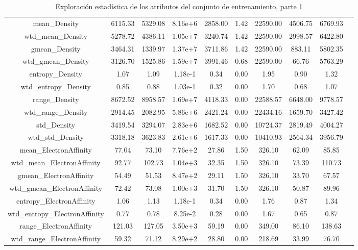 \documentclass[11pt]{article}
\begin{document}
\begin{table}[H]
{\begin{tabular}{|c|c|c|c|c|c|c|c|c|c|}
mean\_Density                     &  6115.33&  5329.08&  8.16e+6&  2858.00&    1.42&  22590.00&  4506.75&  6769.93 \\
wtd\_mean\_Density                 &  5278.72&  4386.11&  1.05e+7&  3240.74&    1.42&  22590.00&  2998.57&  6422.80 \\
gmean\_Density                    &  3464.31&  1339.97&  1.37e+7&  3711.86&    1.42&  22590.00&   883.11&  5802.35 \\
wtd\_gmean\_Density                &  3126.70&  1525.86&  1.59e+7&  3991.46&    0.68&  22590.00&    66.76&  5763.29 \\
entropy\_Density                  &     1.07&     1.09&  1.18e-1&     0.34&    0.00&      1.95&     0.90&     1.32 \\
wtd\_entropy\_Density              &     0.85&     0.88&  1.03e-1&     0.32&    0.00&      1.70&     0.68&     1.07 \\
range\_Density                    &  8672.52&  8958.57&  1.69e+7&  4118.33&    0.00&  22588.57&  6648.00&  9778.57 \\
wtd\_range\_Density                &  2914.45&  2082.95&  5.86e+6&  2421.24&    0.00&  22434.16&  1659.70&  3427.42 \\
std\_Density                      &  3419.54&  3294.07&  2.83e+6&  1682.52&    0.00&  10724.37&  2819.49&  4004.27 \\
wtd\_std\_Density                  &  3318.18&  3623.83&  2.61e+6&  1617.33&    0.00&  10410.93&  2564.34&  3956.79 \\
mean\_ElectronAffinity            &    77.04&    73.10&  7.76e+2&    27.86&    1.50&    326.10&    62.09&    85.85 \\
wtd\_mean\_ElectronAffinity        &    92.77&   102.73&  1.04e+3&    32.35&    1.50&    326.10&    73.39&   110.73 \\
gmean\_ElectronAffinity           &    54.49&    51.53&  8.47e+2&    29.11&    1.50&    326.10&    33.70&    67.57 \\
wtd\_gmean\_ElectronAffinity       &    72.42&    73.08&  1.00e+3&    31.70&    1.50&    326.10&    50.87&    89.96 \\
entropy\_ElectronAffinity         &     1.06&     1.13&  1.18e-1&     0.34&    0.00&      1.76&     0.87&     1.34 \\
wtd\_entropy\_ElectronAffinity     &     0.77&     0.78&  8.25e-2&     0.28&    0.00&      1.67&     0.65&     0.87 \\
range\_ElectronAffinity           &   121.03&   127.05&  3.50e+3&    59.19&    0.00&    349.00&    86.10&   138.63 \\
wtd\_range\_ElectronAffinity       &    59.32&    71.12&  8.29e+2&    28.80&    0.00&    218.69&    33.99&    76.70 \\
    \hline
    \end{tabular}
    }
    \caption{Exploración estadística de los atributos del conjunto de entrenamiento, parte 1}
    \label{Tabla con los estadísticos de las features}
\end{table}
\end{document}
